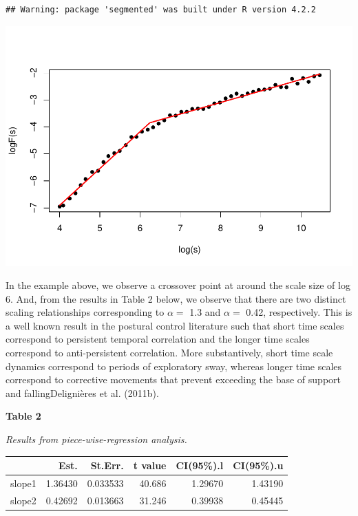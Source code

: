 \documentclass[
  man]{apa6}
\begin{document}
\begin{verbatim}
## Warning: package 'segmented' was built under R version 4.2.2
\end{verbatim}

\includegraphics{fractal_regression_paper_brm_files/figure-latex/unnamed-chunk-6-1.pdf}

In the example above, we observe a crossover point at around the scale
size of log 6. And, from the results in Table 2 below, we observe that
there are two distinct scaling relationships corresponding to \(\alpha =\)
1.3 and \(\alpha =\) 0.42, respectively. This is a well known result in
the postural control literature such that short time scales correspond
to persistent temporal correlation and the longer time scales correspond
to anti-persistent correlation. More substantively, short time scale
dynamics correspond to periods of exploratory sway, whereas longer time
scales correspond to corrective movements that prevent exceeding the
base of support and fallingDelignières et al. (2011b).

\textbf{Table 2}

\emph{Results from piece-wise-regression analysis.}

\begin{table}

\centering
\begin{tabular}[t]{l|r|r|r|r|r}
\hline
  & Est. & St.Err. & t value & CI(95\%).l & CI(95\%).u\\
\hline
slope1 & 1.36430 & 0.033533 & 40.686 & 1.29670 & 1.43190\\
\hline
slope2 & 0.42692 & 0.013663 & 31.246 & 0.39938 & 0.45445\\
\hline
\end{tabular}
\end{table}
\end{document}
